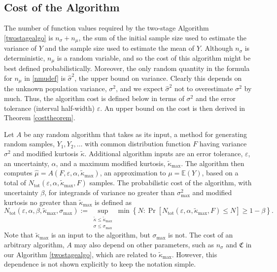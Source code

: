 \documentclass[graybox]{svmult}
\newcommand{\fudge}{\mathfrak{C}}
\newcommand\e{\mathbb{E}}
\newcommand{\Prob}{\Pr}
\newcommand{\hmu}{\hat{\mu}}
\newcommand{\hsigma}{\hat{\sigma}}
\newcommand{\tkappa}{\tilde{\kappa}}
\begin{document}
\subsection{Cost of the Algorithm} \label{algcostsubsec} The number of function values required by the two-stage Algorithm \ref{twostagealgo} is $n_{\sigma}+n_\mu$, the sum of the initial sample size used to estimate the variance of $Y$ and the sample size used to estimate the mean of $Y$.  Although $n_{\sigma}$ is deterministic, $n_\mu$ is a random variable, and so the cost of this algorithm might be best defined probabilistically.  Moreover, the only random quantity in the formula for $n_{\mu}$ in \eqref{nmudef} is $\hsigma^2$, the upper bound on variance.  Clearly this depends on the unknown population variance, $\sigma^2$, and we expect $\hsigma^2$ not to overestimate $\sigma^2$ by much.  Thus, the algorithm cost is defined below in terms of $\sigma^2$ and the error tolerance (interval half-width) $\varepsilon$.  An upper bound on the cost is then derived in Theorem \ref{costtheorem}.

Let $A$ be any random algorithm that takes as its input, a method for generating random samples, $Y_1, Y_2, \ldots $ with common distribution function $F$ having variance $\sigma^2$ and modified kurtosis $\tkappa$.  Additional algorithm inputs are an error tolerance, $\varepsilon$, an uncertainty, $\alpha$, and a maximum modified kurtosis, $\tkappa_{\max}$.  The algorithm then computes $\hmu=A(F,\varepsilon,\alpha,\tkappa_{\max})$, an approximation to $\mu=\e(Y)$, based on a total of $N_{\text{tot}}(\varepsilon,\alpha,\tkappa_{\max},F)$ samples. The probabilistic cost of the algorithm, with uncertainty $\beta$, for integrands of variance no greater than $\sigma^2_{\max}$ and modified kurtosis no greater than $\tkappa_{\max}$ is defined as 
\begin{equation*}
N_{\text{tot}}(\varepsilon,\alpha,\beta,\tkappa_{\max},\sigma_{\max})
:= \sup_{\substack{\tkappa \le \tkappa_{\max} \\ \sigma \le \sigma_{\max}} } \min\left\{N : \Prob[N_{\text{tot}}(\varepsilon,\alpha,\tkappa_{\max},F) \le N] \ge 1-\beta  \right \}.
\end{equation*}
Note that $\tkappa_{\max}$ is an input to the algorithm, but $\sigma_{\max}$ is not.  The cost of an arbitrary algorithm, $A$ may also depend on other parameters, such as $n_\sigma$ and $\fudge$ in our Algorithm \ref{twostagealgo}, which are related to $\tkappa_{\max}$.  However, this dependence is not shown explicitly to keep the notation simple.
\end{document}
